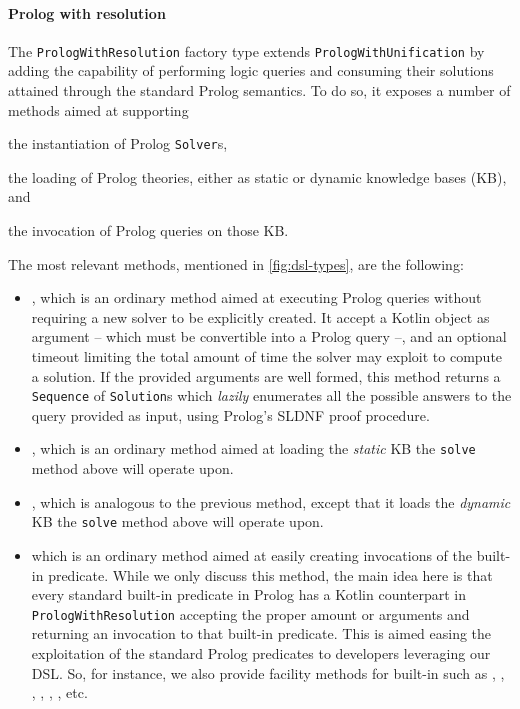 \documentclass[12pt,a4paper,openright,twoside]{book}
\begin{document}
\paragraph{Prolog with resolution}

The \texttt{Pro\-logWi\-thRe\-so\-lu\-tion} factory type extends \texttt{Pro\-logWi\-thU\-ni\-fi\-ca\-tion} by adding the capability of performing logic queries and consuming their solutions attained through the standard Prolog semantics.
%
To do so, it exposes a number of methods aimed at supporting
%
\begin{inlinelist}
    \item the instantiation of Prolog \texttt{Solver}s,
    \item the loading of Prolog theories, either as static or dynamic knowledge bases (KB), and
    \item the invocation of Prolog queries on those KB.
\end{inlinelist}
%
The most relevant methods, mentioned in \cref{fig:dsl-types}, are the following:
%
\begin{itemize}
    \item {},
    which is an ordinary method aimed at executing Prolog queries without requiring a new solver to be explicitly created.
    It accept a Kotlin object as argument -- which must be convertible into a Prolog query --, and an optional timeout limiting the total amount of time the solver may exploit to compute a solution.
    If the provided arguments are well formed, this method returns a \texttt{Sequence} of \texttt{Solution}s which \emph{lazily} enumerates all the possible answers to the query provided as input, using Prolog's SLDNF proof procedure.

    \item {}, which is an ordinary method aimed at loading the \emph{static} KB the \texttt{solve} method above will operate upon.

    \item {}, which is analogous to the previous method, except that it loads the \emph{dynamic} KB the \texttt{solve} method above will operate upon.

    \item {} which is an ordinary method aimed at easily creating invocations of the  built-in predicate.
    While we only discuss this method, the main idea here is that every standard built-in predicate in Prolog has a Kotlin counterpart in \texttt{Pro\-logWi\-thRe\-so\-lu\-tion} accepting the proper amount or arguments and returning an invocation to that built-in predicate.
    This is aimed easing the exploitation of the standard Prolog predicates to developers leveraging our DSL.
    So, for instance, we also provide facility methods for built-in such as , , , , , , etc.
\end{itemize}
\end{document}

